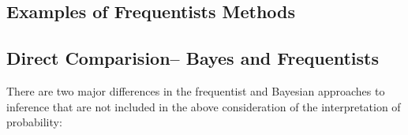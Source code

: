 \documentclass{article}\usepackage[]{graphicx}\usepackage[]{color}
\begin{document}

\subsection{Examples of Frequentists Methods}

\subsection{Direct Comparision-- Bayes and Frequentists}

There are two major differences in the frequentist and Bayesian approaches to inference that are not included in the above consideration of the interpretation of probability:
\end{document}
